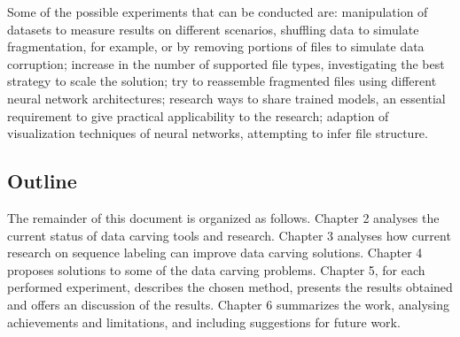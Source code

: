 Some of the possible experiments that can be conducted are:
%
manipulation of datasets to measure results on different scenarios,  shuffling data to simulate fragmentation, for example, or by removing portions of files to simulate data corruption;
%
increase in the number of supported file types, investigating the best strategy to scale the solution;
%
try to reassemble fragmented files using different neural network architectures;
%
research ways to share trained models, an essential requirement to give practical applicability to the research;
%
adaption of visualization techniques of neural networks, attempting to infer file structure.


\subsection{Outline}

The remainder of this document is organized as follows.
    Chapter 2 analyses the current status of data carving tools and research. 
    Chapter 3 analyses how current research on sequence labeling can improve data carving solutions.
    Chapter 4 proposes solutions to some of the data carving problems.
    Chapter 5, for each performed experiment, describes the chosen method, presents the results obtained and offers an discussion of the results.
    Chapter 6 summarizes the work, analysing achievements and limitations, and including suggestions for future work.
